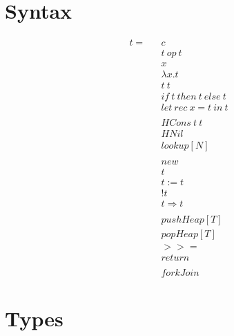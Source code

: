\documentclass{article}
\begin{document}
\section{Syntax}

\begin{eqnarray*}
 t = &&c                       \\
     &&t\ op\ t                \\
     &&x                       \\
     &&\lambda x.t             \\
     &&t\ t                    \\
     &&if\ t\ then\ t\ else\ t \\
     &&let\ rec\ x=t\ in\ t    \\
     &&                        \\     
     &&HCons\ t\ t             \\
     &&HNil                    \\
     &&lookup[N]               \\
     &&                        \\
     &&new                     \\    
     &&t                       \\
     &&t:=t                   \\
     &&!t                      \\
     &&t \Rightarrow t         \\
     &&                        \\
     &&pushHeap[T]             \\
     &&popHeap[T]              \\
     &&>>=                     \\
     &&return                  \\
     &&                        \\
     &&forkJoin
\end{eqnarray*}


\section{Types}
\end{document}
